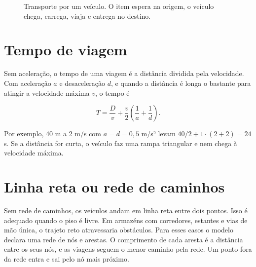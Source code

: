 \begin{figure}[ht]
\centering
{}
\caption{Transporte por um veículo. O item espera na origem, o veículo chega, carrega, viaja e entrega no destino.}
\label{fig-servico}
\end{figure}

\section{Tempo de viagem}

Sem aceleração, o tempo de uma viagem é a distância dividida pela velocidade. Com aceleração $a$ e desaceleração $d$, e quando a distância é longa o bastante para atingir a velocidade máxima $v$, o tempo é

\begin{equation}
T = \frac{D}{v} + \frac{v}{2}\left(\frac{1}{a} + \frac{1}{d}\right).
\end{equation}

Por exemplo, 40 m a 2 m/s com $a = d = 0{,}5$ m/s² levam $40/2 + 1\cdot(2+2) = 24$ s. Se a distância for curta, o veículo faz uma rampa triangular e nem chega à velocidade máxima.

\section{Linha reta ou rede de caminhos}

Sem rede de caminhos, os veículos andam em linha reta entre dois pontos. Isso é adequado quando o piso é livre. Em armazéns com corredores, estantes e vias de mão única, o trajeto reto atravessaria obstáculos. Para esses casos o modelo declara uma rede de nós e arestas. O comprimento de cada aresta é a distância entre os seus nós, e as viagens seguem o menor caminho pela rede. Um ponto fora da rede entra e sai pelo nó mais próximo.

